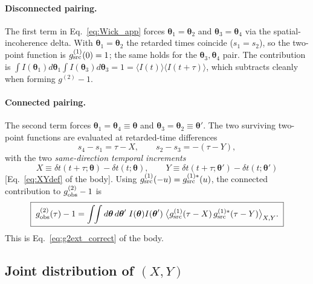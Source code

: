\documentclass[aps,prd,onecolumn,amsmath,amssymb]{revtex4-2}
\begin{document}
\paragraph{Disconnected pairing.}
The first term in Eq.~\eqref{eq:Wick_app} forces
$\boldsymbol{\theta}_1=\boldsymbol{\theta}_2$ and
$\boldsymbol{\theta}_3=\boldsymbol{\theta}_4$ via the spatial-incoherence
delta.  With $\boldsymbol{\theta}_1=\boldsymbol{\theta}_2$ the retarded
times coincide ($s_1=s_2$), so the two-point function is
$g^{(1)}_{\rm src}(0)=1$; the same holds for the
$\boldsymbol{\theta}_3,\boldsymbol{\theta}_4$ pair.  The contribution is
$\int I(\boldsymbol{\theta}_1)d\boldsymbol{\theta}_1 \int
I(\boldsymbol{\theta}_3)d\boldsymbol{\theta}_3 = 1 =
\langle I(t)\rangle\langle I(t+\tau)\rangle$, which subtracts cleanly
when forming $g^{(2)}-1$.

\paragraph{Connected pairing.}
The second term forces $\boldsymbol{\theta}_1=\boldsymbol{\theta}_4\equiv
\boldsymbol{\theta}$ and $\boldsymbol{\theta}_3=\boldsymbol{\theta}_2\equiv
\boldsymbol{\theta}'$.  The two surviving two-point functions are
evaluated at retarded-time differences
\begin{equation}
  s_4 - s_1 = \tau - X,\qquad
  s_2 - s_3 = -(\tau - Y),
\end{equation}
with the two \emph{same-direction temporal increments}
\begin{equation}
  X \equiv \delta t(t+\tau;\boldsymbol{\theta}) - \delta t(t;\boldsymbol{\theta}),
  \qquad
  Y \equiv \delta t(t+\tau;\boldsymbol{\theta}') - \delta t(t;\boldsymbol{\theta}')
\end{equation}
[Eq.~\eqref{eq:XYdef} of the body].
Using $g^{(1)}_{\rm src}(-u) = g^{(1)*}_{\rm src}(u)$, the connected
contribution to $g^{(2)}_{\rm obs}-1$ is
\begin{equation*}
  \boxed{\;
  g^{(2)}_{\rm obs}(\tau) - 1
    = \int\!\!\int d\boldsymbol{\theta}\,d\boldsymbol{\theta}'\;
      I(\boldsymbol{\theta})I(\boldsymbol{\theta}')\;
      \big\langle g^{(1)}_{\rm src}(\tau - X)\,
                 g^{(1)*}_{\rm src}(\tau - Y)\big\rangle_{X,Y}.
  \;}
\end{equation*}
This is Eq.~\eqref{eq:g2ext_correct} of the body.

\subsection{Joint distribution of $(X,Y)$}
\end{document}
